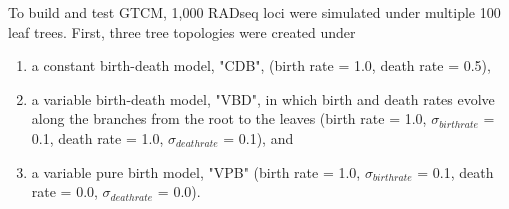 \documentclass[11pt]{article}
\providecommand{\tightlist}{%
      \setlength{\itemsep}{0pt}\setlength{\parskip}{0pt}}
\begin{document}
To build and test GTCM, 1,000 RADseq loci were simulated under multiple
100 leaf trees. First, three tree topologies were created under

\begin{enumerate}
\def\labelenumi{\arabic{enumi}.}
\tightlist
\item
  a constant birth-death model, "CDB", (birth rate = 1.0, death rate =
  0.5),
\item
  a variable birth-death model, "VBD", in which birth and death rates
  evolve along the branches from the root to the leaves (birth rate =
  1.0, \(\sigma_{birth rate}\) = 0.1, death rate = 1.0,
  \(\sigma_{death rate}\) = 0.1), and
\item
  a variable pure birth model, "VPB" (birth rate = 1.0,
  \(\sigma_{birth rate}\) = 0.1, death rate = 0.0,
  \(\sigma_{death rate}\) = 0.0).
\end{enumerate}
\end{document}

